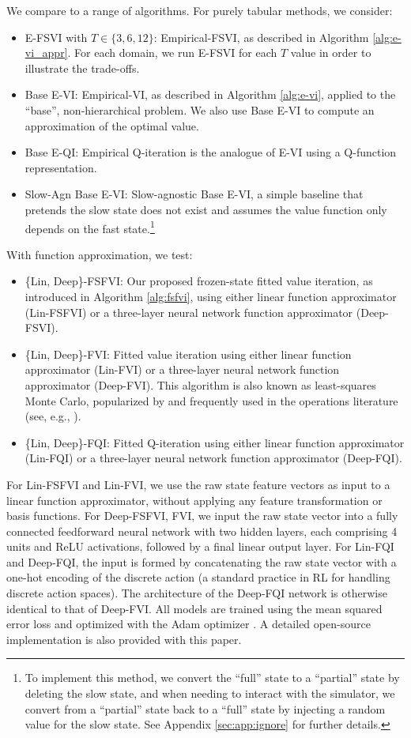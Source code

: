 \documentclass[11pt, notitlepage]{article}
\newcommand{\1}{\mathbbm{1}}
\begin{document}
We compare to a range of algorithms. For purely tabular methods, we consider:
\begin{itemize}
    \item E-FSVI with $T\in \{3, 6, 12\}$: Empirical-FSVI, as described in Algorithm \ref{alg:e-vi_appr}. For each domain, we run E-FSVI for each $T$ value in order to illustrate the trade-offs.
    \item Base E-VI: Empirical-VI, as described in Algorithm \ref{alg:e-vi}, applied to the ``base'', non-hierarchical problem. We also use Base E-VI to compute an approximation of the optimal value.
    \item Base E-QI: Empirical Q-iteration is the analogue of E-VI using a Q-function representation. 
    \item Slow-Agn Base E-VI: Slow-agnostic Base E-VI, a simple baseline that pretends the slow state does not exist and assumes the value function only depends on the fast state.\footnote{To implement this method, we convert the ``full'' state to a ``partial'' state by deleting the slow state, and when needing to interact with the simulator, we convert from a ``partial'' state back to a ``full'' state by injecting a random value for the slow state. See Appendix \ref{sec:app:ignore} for further details.}
\end{itemize}
With function approximation, we test:
\begin{itemize}
    \item \{Lin, Deep\}-FSFVI: Our proposed frozen-state fitted value iteration, as introduced in Algorithm \ref{alg:fsfvi}, using either linear function approximator (Lin-FSFVI) or a three-layer neural network function approximator (Deep-FSVI).
    \item \{Lin, Deep\}-FVI: Fitted value iteration \citep{munos2008finite}  using either linear function approximator (Lin-FVI) or a three-layer neural network function approximator (Deep-FVI). This algorithm is also known as least-squares Monte Carlo, popularized by \cite{longstaff2001valuing} and frequently used in the operations literature (see, e.g., \cite{nadarajah2017comparison}). 
    \item \{Lin, Deep\}-FQI: Fitted Q-iteration \citep{ernst2005tree} using either linear function approximator (Lin-FQI) or a three-layer neural network function approximator (Deep-FQI).
\end{itemize}
For Lin-FSFVI and Lin-FVI, we use the raw state feature vectors as input to a linear function approximator, without applying any feature transformation or basis functions. For Deep-{FSFVI, FVI}, we input the raw state vector into a fully connected feedforward neural network with two hidden layers, each comprising 4 units and ReLU activations, followed by a final linear output layer. For Lin-FQI and Deep-FQI, the input is formed by concatenating the raw state vector with a one-hot encoding of the discrete action (a standard practice in RL for handling discrete action spaces). The architecture of the Deep-FQI network is otherwise identical to that of Deep-FVI. All models are trained using the mean squared error loss and optimized with the Adam optimizer \citep{kingma2014adam}. A detailed open-source implementation is also provided with this paper.
\end{document}
